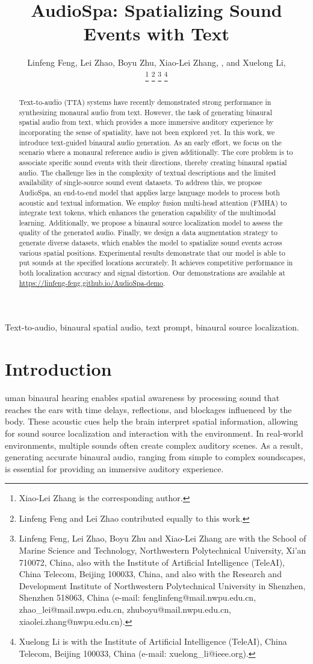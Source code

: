 \documentclass{IEEEtran}
\title{AudioSpa: Spatializing Sound Events with Text}
\author{
    {Linfeng Feng, Lei Zhao, Boyu Zhu, Xiao-Lei Zhang, \IEEEmembership{Senior Member, IEEE}, and Xuelong Li, \IEEEmembership{Fellow, IEEE}}

    \thanks{Xiao-Lei Zhang is the corresponding author.}
    \thanks{Linfeng Feng and Lei Zhao contributed equally to this work.}
    \thanks{Linfeng Feng, Lei Zhao, Boyu Zhu and Xiao-Lei Zhang are with the School of Marine Science and Technology, Northwestern Polytechnical University, Xi’an 710072, China, also with the Institute of Artificial Intelligence (TeleAI), China Telecom, Beijing 100033, China, and also with the Research and Development Institute of Northwestern Polytechnical University in Shenzhen, Shenzhen 518063, China (e-mail: fenglinfeng@mail.nwpu.edu.cn, zhao\_lei@mail.nwpu.edu.cn, zhuboyu@mail.nwpu.edu.cn, xiaolei.zhang@nwpu.edu.cn).}
    \thanks{Xuelong Li is with the Institute of Artificial Intelligence (TeleAI), China Telecom, Beijing 100033, China (e-mail: xuelong\_li@ieee.org).}

}
\begin{document}
\maketitle

\begin{abstract}
  Text-to-audio (TTA) systems have recently demonstrated strong performance in synthesizing monaural audio from text. However, the task of generating binaural spatial audio from text, which provides a more immersive auditory experience by incorporating the sense of spatiality, have not been explored yet. In this work, we introduce text-guided binaural audio generation. As an early effort, we focus on the scenario where a monaural reference audio is given additionally. The core problem is to associate specific sound events with their directions, thereby creating binaural spatial audio. The challenge lies in the complexity of textual descriptions and the limited availability of single-source sound event datasets. To address this, we propose AudioSpa, an end-to-end model that applies large language models to process both acoustic and textual information. We employ fusion multi-head attention (FMHA) to integrate text tokens, which enhances the generation capability of the multimodal learning. Additionally, we propose a binaural source localization model to assess the quality of the generated audio. Finally, we design a data augmentation strategy to generate diverse datasets, which enables the model to spatialize sound events across various spatial positions. Experimental results demonstrate that our model is able to put sounds at the specified locations accurately. It achieves competitive performance in both localization accuracy and signal distortion. Our demonstrations are available at \href{https://linfeng-feng.github.io/AudioSpa-demo}{https://linfeng-feng.github.io/AudioSpa-demo}.
\end{abstract}

\begin{IEEEkeywords}
    Text-to-audio, binaural spatial audio, text prompt, binaural source localization.
\end{IEEEkeywords}

\section{Introduction} \label{sec:introduction}
uman binaural hearing enables spatial awareness by processing sound that reaches the ears with time delays, reflections, and blockages influenced by the body. These acoustic cues help the brain interpret spatial information, allowing for sound source localization and interaction with the environment. In real-world environments, multiple sounds often create complex auditory scenes. As a result, generating accurate binaural audio, ranging from simple to complex soundscapes, is essential for providing an immersive auditory experience.
\end{document}
